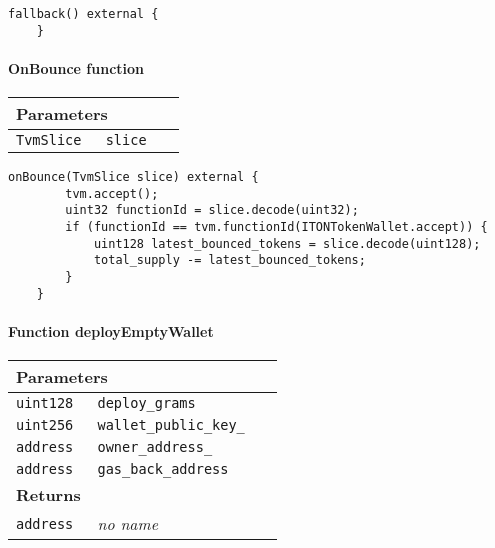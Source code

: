 \vspace{2cm}

\begin{lstlisting}[firstnumber=523]
    fallback() external {
    }
\end{lstlisting}

\paragraph{OnBounce function}


\ifsoltables
\noindent\begin{tabular}{|l|l|p{5cm}|}\hline
\multicolumn{3}{|l|}{\bf Parameters}\\\hline
\tt TvmSlice & \tt slice &\\\hline
\end{tabular}
\fi

\vspace{2cm}

\begin{lstlisting}[firstnumber=514]
    onBounce(TvmSlice slice) external {
        tvm.accept();
        uint32 functionId = slice.decode(uint32);
        if (functionId == tvm.functionId(ITONTokenWallet.accept)) {
            uint128 latest_bounced_tokens = slice.decode(uint128);
            total_supply -= latest_bounced_tokens;
        }
    }
\end{lstlisting}

\paragraph{Function deployEmptyWallet}


\ifsoltables
\noindent\begin{tabular}{|l|l|p{5cm}|}\hline
\multicolumn{3}{|l|}{\bf Parameters}\\\hline
\tt uint128 & \tt deploy\_{}grams &\\\hline
\tt uint256 & \tt wallet\_{}public\_{}key\_{} &\\\hline
\tt address & \tt owner\_{}address\_{} &\\\hline
\tt address & \tt gas\_{}back\_{}address &\\\hline
\multicolumn{3}{|l|}{\bf Returns}\\\hline
\tt address & {\em no name} &\\\hline
\end{tabular}
\fi

\vspace{2cm}

